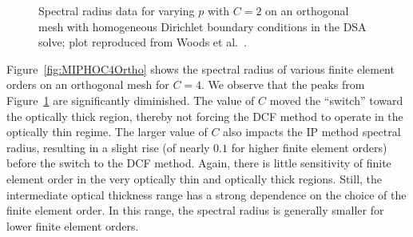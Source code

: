 \documentclass[12pt]{article}
\begin{document}
\begin{figure}[!hbt]
\centering
{}
\caption{Spectral radius data for varying $p$ with $C=2$ on an orthogonal mesh with homogeneous Dirichlet boundary conditions in the DSA solve; plot reproduced from Woods et al.~\cite{WoodsDSA}.}
\label{fig:MIPHOC2Ortho}
\end{figure}

Figure~\ref{fig:MIPHOC4Ortho} shows the spectral radius of various finite element orders on an orthogonal mesh for $C=4$. We observe that the peaks from Figure~\ref{fig:MIPHOC2Ortho} are significantly diminished. The value of $C$ moved the ``switch'' toward the optically thick region, thereby not forcing the DCF method to operate in the optically thin regime. The larger value of $C$ also impacts the IP method spectral radius, resulting in a slight rise (of nearly $0.1$ for higher finite element orders) before the switch to the DCF method. Again, there is little sensitivity of finite element order in the very optically thin and optically thick regions. Still, the intermediate optical thickness range has a strong dependence on the choice of the finite element order. In this range, the spectral radius is generally smaller for lower finite element orders.
\end{document}
